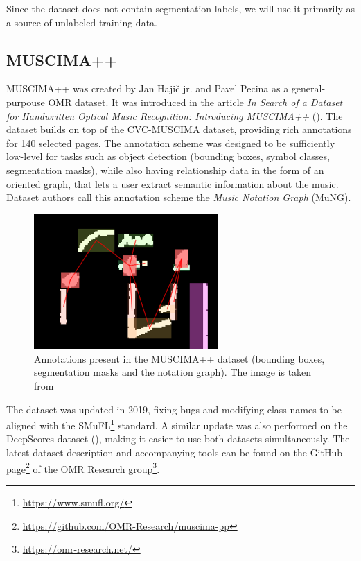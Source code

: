 Since the dataset does not contain segmentation labels, we will use it primarily as a source of unlabeled training data.


\subsection{MUSCIMA++}

MUSCIMA++ was created by Jan Hajič jr. and Pavel Pecina as a general-purpouse OMR dataset. It was introduced in the article \emph{In Search of a Dataset for Handwritten Optical Music Recognition: Introducing MUSCIMA++} (\cite{MuscimaPP}). The dataset builds on top of the CVC-MUSCIMA dataset, providing rich annotations for 140 selected pages. The annotation scheme was designed to be sufficiently low-level for tasks such as object detection (bounding boxes, symbol classes, segmentation masks), while also having relationship data in the form of an oriented graph, that lets a user extract semantic information about the music. Dataset authors call this annotation scheme the \emph{Music Notation Graph} (MuNG).

\begin{figure}[ht]
    \centering
    \includegraphics[width=70mm]{../img/muscima-pp.png}
    \caption{Annotations present in the MUSCIMA++ dataset (bounding boxes, segmentation masks and the notation graph). The image is taken from \cite{MuscimaPP}}
    \label{fig:MuscimaPP}
\end{figure}

The dataset was updated in 2019, fixing bugs and modifying class names to be aligned with the SMuFL\footnote{\url{https://www.smufl.org/}} standard. A similar update was also performed on the DeepScores dataset (\cite{DeepScores}), making it easier to use both datasets simultaneously. The latest dataset description and accompanying tools can be found on the GitHub page\footnote{\url{https://github.com/OMR-Research/muscima-pp}} of the OMR Research group\footnote{\url{https://omr-research.net/}}.


